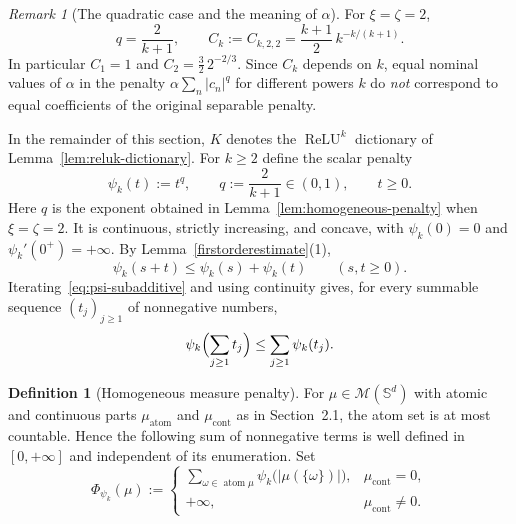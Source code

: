 \documentclass[11pt]{amsart}
\theoremstyle{definition}
\newtheorem{definition}[theorem]{Definition}
\theoremstyle{remark}
\newtheorem{remark}[theorem]{Remark}
\DeclareMathOperator{\atom}{atom}
\DeclareMathOperator{\cont}{cont}
\DeclareMathOperator{\relu}{ReLU}
\newcommand{\reluk}{\relu^{k}}
\begin{document}
\begin{remark}[The quadratic case and the meaning of $\alpha$]
\label{rem:homogeneous-effective-alpha}
For $\xi=\zeta=2$,
\begin{equation*}
	q=\frac{2}{k+1},
	\qquad
	C_k:=C_{k,2,2}
	=\frac{k+1}{2}\,k^{-k/(k+1)}.
\end{equation*}
In particular $C_1=1$ and $C_2=\tfrac32\,2^{-2/3}$.
Since $C_k$ depends on
$k$, equal nominal values of $\alpha$ in the penalty $\alpha\sum_n|c_n|^q$ for different powers $k$ do
\emph{not} correspond to equal coefficients of the original separable
penalty.
\end{remark}

In the remainder of this section, $K$ denotes the $\reluk$ dictionary of
Lemma~\ref{lem:reluk-dictionary}.
For $k\ge2$ define the scalar penalty
\begin{equation*}
	\psi_k(t):=t^q,
	\qquad
	q:=\frac2{k+1}\in(0,1),
	\qquad t\ge0.
\end{equation*}
Here $q$ is the exponent obtained in Lemma~\ref{lem:homogeneous-penalty} when
$\xi=\zeta=2$.
It is continuous, strictly increasing, and concave, with $\psi_k(0)=0$ and
$\psi_k'(0^+)=+\infty$. By Lemma~\ref{firstorderestimate}(1),
\begin{equation}
\label{eq:psi-subadditive}
	\psi_k(s+t)\le\psi_k(s)+\psi_k(t)
	\qquad(s,t\ge0).
\end{equation}
Iterating~\eqref{eq:psi-subadditive} and using continuity gives, for every
summable sequence $(t_j)_{j\ge1}$ of nonnegative numbers,
\begin{equation}
\label{eq:psi-countable-subadditive}
	\psi_k\Bigl(\sum_{j\ge1}t_j\Bigr)\le\sum_{j\ge1}\psi_k(t_j).
\end{equation}

\begin{definition}[Homogeneous measure penalty]
\label{def:homogeneous-penalty}
For $\mu\in\mathcal M(\mathbb S^d)$ with atomic and continuous parts
$\mu_{\atom}$ and $\mu_{\cont}$ as in Section~2.1, the atom set is at most
countable. Hence the following sum of nonnegative terms is well defined in
$[0,+\infty]$ and independent of its enumeration. Set
\begin{equation*}
	\Phi_{\psi_k}(\mu):=
	\begin{cases}
		\displaystyle
		\sum_{\omega\in\atom\mu}\psi_k\bigl(|\mu(\{\omega\})|\bigr),
		&\mu_{\cont}=0,\\[10pt]
		+\infty,&\mu_{\cont}\ne0.
	\end{cases}
\end{equation*}
\end{definition}
\end{document}
